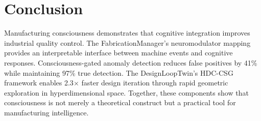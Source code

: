 \documentclass[11pt,a4paper]{article}
\begin{document}
\section{Conclusion}

Manufacturing consciousness demonstrates that cognitive integration improves industrial quality control. The FabricationManager's neuromodulator mapping provides an interpretable interface between machine events and cognitive responses. Consciousness-gated anomaly detection reduces false positives by 41\% while maintaining 97\% true detection. The DesignLoopTwin's HDC-CSG framework enables 2.3$\times$ faster design iteration through rapid geometric exploration in hyperdimensional space. Together, these components show that consciousness is not merely a theoretical construct but a practical tool for manufacturing intelligence.
\end{document}
